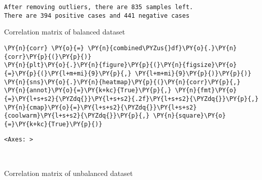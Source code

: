     \begin{Verbatim}[commandchars=\\\{\}]
After removing outliers, there are 835 samples left.
There are 394 positive cases and 441 negative cases
    \end{Verbatim}

    Correlation matrix of balanced dataset

    \begin{tcolorbox}[breakable, size=fbox, boxrule=1pt, pad at break*=1mm,colback=cellbackground, colframe=cellborder]
\begin{Verbatim}[commandchars=\\\{\}]
\PY{n}{corr} \PY{o}{=} \PY{n}{combined\PYZus{}df}\PY{o}{.}\PY{n}{corr}\PY{p}{(}\PY{p}{)}
\PY{n}{plt}\PY{o}{.}\PY{n}{figure}\PY{p}{(}\PY{n}{figsize}\PY{o}{=}\PY{p}{(}\PY{l+m+mi}{9}\PY{p}{,} \PY{l+m+mi}{9}\PY{p}{)}\PY{p}{)}
\PY{n}{sns}\PY{o}{.}\PY{n}{heatmap}\PY{p}{(}\PY{n}{corr}\PY{p}{,} \PY{n}{annot}\PY{o}{=}\PY{k+kc}{True}\PY{p}{,} \PY{n}{fmt}\PY{o}{=}\PY{l+s+s2}{\PYZdq{}}\PY{l+s+s2}{.2f}\PY{l+s+s2}{\PYZdq{}}\PY{p}{,} \PY{n}{cmap}\PY{o}{=}\PY{l+s+s2}{\PYZdq{}}\PY{l+s+s2}{coolwarm}\PY{l+s+s2}{\PYZdq{}}\PY{p}{,} \PY{n}{square}\PY{o}{=}\PY{k+kc}{True}\PY{p}{)}
\end{Verbatim}
\end{tcolorbox}

            \begin{tcolorbox}[breakable, size=fbox, boxrule=.5pt, pad at break*=1mm, opacityfill=0]
\begin{Verbatim}[commandchars=\\\{\}]
<Axes: >
\end{Verbatim}
\end{tcolorbox}
        
    \begin{center}
    \end{center}
    { \hspace*{\fill} \\}
    
    Correlation matrix of unbalanced dataset


